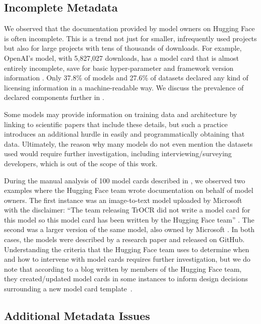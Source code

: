 \subsection{Incomplete Metadata}
\label{sec:incomplete_metadata}
We observed that the documentation provided by model owners on Hugging Face is often incomplete. %
This is a trend not just for smaller, infrequently used projects but also for large projects with tens of thousands of downloads. For example, OpenAI's  model, with 5,827,027 downloads, has a model card that is almost entirely incomplete, save for basic hyper-parameter and framework version information  \cite{incomplete_docs_example}.  %
Only 37.8\% of models and 27.6\% of datasets declared any kind of licensing information in a machine-readable way.  We discuss the prevalence of declared components further in . %

Some models may provide information on training data and architecture by linking to scientific papers that include these details, but such a practice introduces an additional hurdle in easily and programmatically obtaining that data.  Ultimately, the reason why many models do not even mention the datasets used would require further investigation, including interviewing/surveying developers, which is out of the scope of this work.   %

During the manual analysis of 100 model cards described in , we observed two examples where
the Hugging Face team wrote documentation on behalf of model owners.  The first instance was an image-to-text model 
uploaded by Microsoft with the disclaimer: ``The team releasing TrOCR did not write a model card for this model so this 
model card has been written by the Hugging Face team'' \cite{hugging_face_authored_1}. The second was a larger version of
the same model, also owned by Microsoft \cite{hugging_face_authored_2}.  In both cases, the models were described by a
research paper and released on GitHub.  Understanding the criteria that the Hugging Face team uses to determine when and 
how to intervene with model cards requires further investigation, but we do note that according to a blog written by 
members of the Hugging Face team, they created/updated model cards in some instances to inform design decisions surrounding a new 
model card template~\cite{hugging_face_model_card_blog}. %


\subsection{Additional Metadata Issues}


